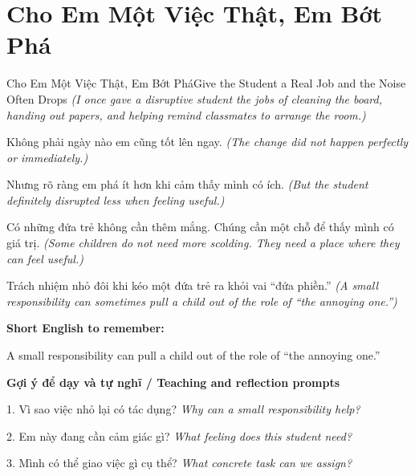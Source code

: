 \section{Cho Em Một Việc Thật, Em Bớt Phá}
\begin{truyen}{Cho Em Một Việc Thật, Em Bớt Phá}{Give the Student a Real Job and the Noise Often Drops}
\textit{(I once gave a disruptive student the jobs of cleaning the board, handing out papers, and helping remind classmates to arrange the room.)}

Không phải ngày nào em cũng tốt lên ngay.
\textit{(The change did not happen perfectly or immediately.)}

Nhưng rõ ràng em phá ít hơn khi cảm thấy mình có ích.
\textit{(But the student definitely disrupted less when feeling useful.)}

Có những đứa trẻ không cần thêm mắng. Chúng cần một chỗ để thấy mình có giá trị.
\textit{(Some children do not need more scolding. They need a place where they can feel useful.)}

\end{truyen}

\begin{baihoc}
Trách nhiệm nhỏ đôi khi kéo một đứa trẻ ra khỏi vai “đứa phiền.”
\textit{(A small responsibility can sometimes pull a child out of the role of “the annoying one.”)}
\end{baihoc}

\begin{ghinhoanh}
\textbf{Short English to remember:}

A small responsibility can pull a child out of the role of “the annoying one.”

\end{ghinhoanh}

\begin{tuhocnhanh}
\textbf{Gợi ý để dạy và tự nghĩ / Teaching and reflection prompts}

1. Vì sao việc nhỏ lại có tác dụng? \textit{Why can a small responsibility help?}

2. Em này đang cần cảm giác gì? \textit{What feeling does this student need?}

3. Mình có thể giao việc gì cụ thể? \textit{What concrete task can we assign?}
\end{tuhocnhanh}
